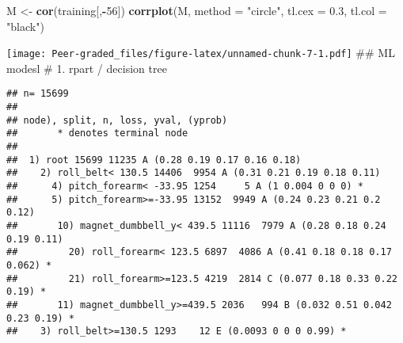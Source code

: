 \documentclass[]{article}
\newenvironment{Shaded}{\begin{snugshade}}{\end{snugshade}}
\newcommand{\CommentTok}[1]{\textcolor[rgb]{0.56,0.35,0.01}{\textit{#1}}}
\newcommand{\DataTypeTok}[1]{\textcolor[rgb]{0.13,0.29,0.53}{#1}}
\newcommand{\DecValTok}[1]{\textcolor[rgb]{0.00,0.00,0.81}{#1}}
\newcommand{\FloatTok}[1]{\textcolor[rgb]{0.00,0.00,0.81}{#1}}
\newcommand{\KeywordTok}[1]{\textcolor[rgb]{0.13,0.29,0.53}{\textbf{#1}}}
\newcommand{\NormalTok}[1]{#1}
\newcommand{\OperatorTok}[1]{\textcolor[rgb]{0.81,0.36,0.00}{\textbf{#1}}}
\newcommand{\StringTok}[1]{\textcolor[rgb]{0.31,0.60,0.02}{#1}}
\begin{document}
\begin{Shaded}
\begin{Highlighting}[]
\NormalTok{M <-}\StringTok{ }\KeywordTok{cor}\NormalTok{(training[,}\OperatorTok{-}\DecValTok{56}\NormalTok{])}
\KeywordTok{corrplot}\NormalTok{(M, }\DataTypeTok{method =} \StringTok{"circle"}\NormalTok{, }\DataTypeTok{tl.cex =} \FloatTok{0.3}\NormalTok{,  }\DataTypeTok{tl.col =} \StringTok{"black"}\NormalTok{)}
\end{Highlighting}
\end{Shaded}

\texttt{[image: Peer-graded\_files/figure-latex/unnamed-chunk-7-1.pdf]}
\#\# ML modesl \# 1. rpart / decision tree

\begin{Shaded}
\end{Shaded}

\begin{verbatim}
## n= 15699 
## 
## node), split, n, loss, yval, (yprob)
##       * denotes terminal node
## 
##  1) root 15699 11235 A (0.28 0.19 0.17 0.16 0.18)  
##    2) roll_belt< 130.5 14406  9954 A (0.31 0.21 0.19 0.18 0.11)  
##      4) pitch_forearm< -33.95 1254     5 A (1 0.004 0 0 0) *
##      5) pitch_forearm>=-33.95 13152  9949 A (0.24 0.23 0.21 0.2 0.12)  
##       10) magnet_dumbbell_y< 439.5 11116  7979 A (0.28 0.18 0.24 0.19 0.11)  
##         20) roll_forearm< 123.5 6897  4086 A (0.41 0.18 0.18 0.17 0.062) *
##         21) roll_forearm>=123.5 4219  2814 C (0.077 0.18 0.33 0.22 0.19) *
##       11) magnet_dumbbell_y>=439.5 2036   994 B (0.032 0.51 0.042 0.23 0.19) *
##    3) roll_belt>=130.5 1293    12 E (0.0093 0 0 0 0.99) *
\end{verbatim}
\end{document}
